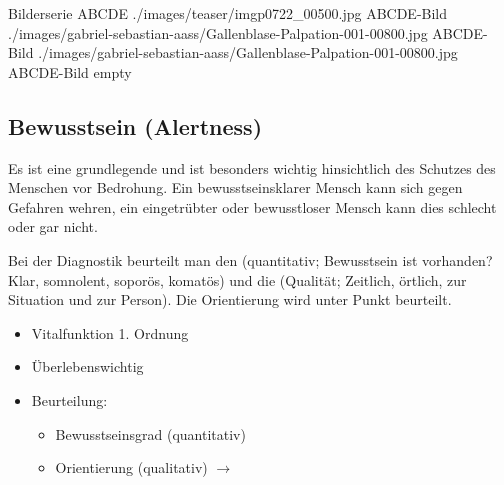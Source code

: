 \begin{PictureSeriesWide}{}{Bilderserie ABCDE}
{./images/teaser/imgp0722_00500.jpg}
{ABCDE-Bild}
{./images/gabriel-sebastian-aass/Gallenblase-Palpation-001-00800.jpg}
{ABCDE-Bild}
{./images/gabriel-sebastian-aass/Gallenblase-Palpation-001-00800.jpg}
{ABCDE-Bild}
{empty}
{}
\end{PictureSeriesWide}

\clearpage
\subsection{{} Bewusstsein
(Alertness)}



\label{topic:bewusstsein}



{ 
Es ist eine grundlegende
 und ist besonders wichtig
hinsichtlich des Schutzes des Menschen vor Bedrohung. Ein bewusstseinsklarer
Mensch kann sich gegen Gefahren wehren, ein eingetrübter
oder bewusstloser Mensch kann dies schlecht oder gar nicht. 

Bei der Diagnostik beurteilt man 
den (quantitativ;
 Bewusstsein ist vorhanden? Klar, somnolent, soporös, komatös) und
die  (Qualität;  Zeitlich, örtlich, zur Situation und zur
Person). Die Orientierung wird unter
Punkt  beurteilt.
}{
\begin{itemize}
  \item Vitalfunktion 1. Ordnung
  \item Überlebenswichtig
  \item Beurteilung:
  \begin{itemize}
    \item Bewusstseinsgrad (quantitativ)
    \item Orientierung (qualitativ) $\rightarrow$ 
  \end{itemize}
\end{itemize}
}{}{}{}



